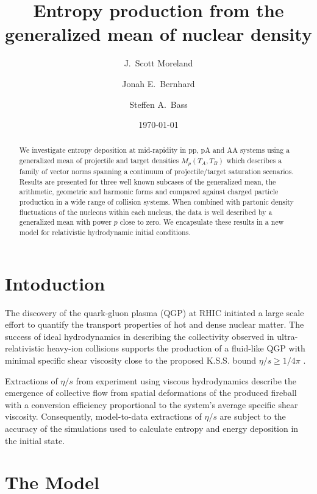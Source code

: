 \documentclass[aps,prl,reprint,amsmath,nofootinbib]{revtex4-1}
\begin{document}
\title{Entropy production from the generalized mean of nuclear density}

\author{J.\ Scott Moreland}
\author{Jonah E.\ Bernhard}
\author{Steffen A.\ Bass}

\date{\today}


\begin{abstract}
   We investigate entropy deposition at mid-rapidity in pp, pA and AA systems using a generalized mean of projectile and target 
densities $M_p(T_A,T_B)$ which describes a family of vector norms spanning a continuum of projectile/target saturation scenarios. 
Results are presented for three well known subcases of the generalized mean, the arithmetic, geometric and harmonic forms and 
compared against charged particle production in a wide range of collision systems. When combined with partonic density fluctuations of 
the nucleons within each nucleus, the data is well described by a generalized mean with power $p$ close to zero. We encapsulate 
these results in a new model for relativistic hydrodynamic initial conditions.
\end{abstract}

\maketitle

\section{Intoduction}

The discovery of the quark-gluon plasma (QGP) at RHIC initiated a large scale effort to quantify the transport properties of 
hot and dense nuclear matter. The success of ideal hydrodynamics in describing the collectivity observed in ultra-relativistic 
heavy-ion collisions supports the production of a fluid-like QGP with minimal specific shear viscosity close to the proposed 
K.S.S. bound $\eta/s \ge 1/4\pi$ \cite{KSS, Bjorken:1982qr}. 

Extractions of $\eta/s$ from experiment using viscous hydrodynamics describe the emergence of collective flow from spatial 
deformations of the produced fireball with a conversion efficiency proportional to the system's average specific shear viscosity. 
Consequently, model-to-data extractions of $\eta/s$ are subject to the accuracy of the simulations used to calculate entropy and 
energy deposition in the initial state.

\section{The Model}
\end{document}
